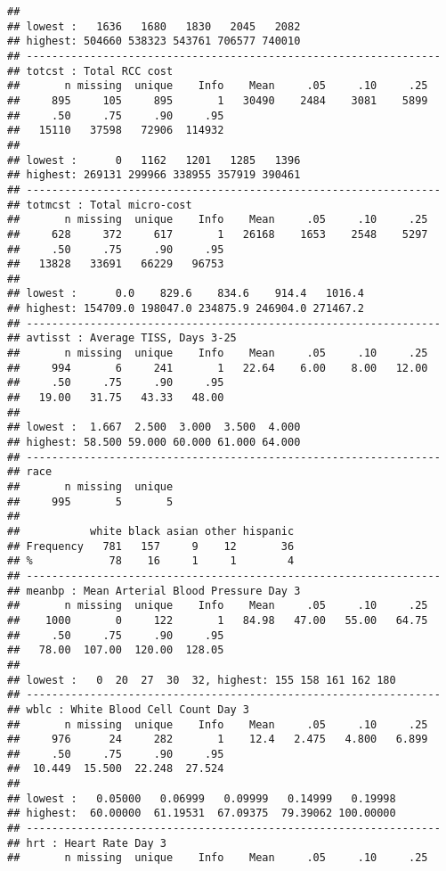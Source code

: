 \documentclass[headinclude=false]{scrartcl}\usepackage[]{graphicx}\usepackage[]{color}
\makeatletter
\newenvironment{kframe}{%
 \def\at@end@of@kframe{}%
 \ifinner\ifhmode%
  \def\at@end@of@kframe{\end{minipage}}%
  \begin{minipage}{\columnwidth}%
 \fi\fi%
 \def\FrameCommand##1{\hskip\@totalleftmargin \hskip-\fboxsep
 \colorbox{shadecolor}{##1}\hskip-\fboxsep
     \hskip-\linewidth \hskip-\@totalleftmargin \hskip\columnwidth}%
 \MakeFramed {\advance\hsize-\width
   \@totalleftmargin\z@ \linewidth\hsize
   \@setminipage}}%
 {\par\unskip\endMakeFramed%
 \at@end@of@kframe}
\newenvironment{knitrout}{}{} %
\makeatother
\begin{document}
\begin{knitrout}
\begin{kframe}
\begin{verbatim}
## 
## lowest :   1636   1680   1830   2045   2082
## highest: 504660 538323 543761 706577 740010 
## -----------------------------------------------------------------
## totcst : Total RCC cost 
##       n missing  unique    Info    Mean     .05     .10     .25 
##     895     105     895       1   30490    2484    3081    5899 
##     .50     .75     .90     .95 
##   15110   37598   72906  114932 
## 
## lowest :      0   1162   1201   1285   1396
## highest: 269131 299966 338955 357919 390461 
## -----------------------------------------------------------------
## totmcst : Total micro-cost 
##       n missing  unique    Info    Mean     .05     .10     .25 
##     628     372     617       1   26168    1653    2548    5297 
##     .50     .75     .90     .95 
##   13828   33691   66229   96753 
## 
## lowest :      0.0    829.6    834.6    914.4   1016.4
## highest: 154709.0 198047.0 234875.9 246904.0 271467.2 
## -----------------------------------------------------------------
## avtisst : Average TISS, Days 3-25 
##       n missing  unique    Info    Mean     .05     .10     .25 
##     994       6     241       1   22.64    6.00    8.00   12.00 
##     .50     .75     .90     .95 
##   19.00   31.75   43.33   48.00 
## 
## lowest :  1.667  2.500  3.000  3.500  4.000
## highest: 58.500 59.000 60.000 61.000 64.000 
## -----------------------------------------------------------------
## race 
##       n missing  unique 
##     995       5       5 
## 
##           white black asian other hispanic
## Frequency   781   157     9    12       36
## %            78    16     1     1        4
## -----------------------------------------------------------------
## meanbp : Mean Arterial Blood Pressure Day 3 
##       n missing  unique    Info    Mean     .05     .10     .25 
##    1000       0     122       1   84.98   47.00   55.00   64.75 
##     .50     .75     .90     .95 
##   78.00  107.00  120.00  128.05 
## 
## lowest :   0  20  27  30  32, highest: 155 158 161 162 180 
## -----------------------------------------------------------------
## wblc : White Blood Cell Count Day 3 
##       n missing  unique    Info    Mean     .05     .10     .25 
##     976      24     282       1    12.4   2.475   4.800   6.899 
##     .50     .75     .90     .95 
##  10.449  15.500  22.248  27.524 
## 
## lowest :   0.05000   0.06999   0.09999   0.14999   0.19998
## highest:  60.00000  61.19531  67.09375  79.39062 100.00000 
## -----------------------------------------------------------------
## hrt : Heart Rate Day 3 
##       n missing  unique    Info    Mean     .05     .10     .25 

\end{verbatim}
\end{kframe}
\end{knitrout}
\end{document}
